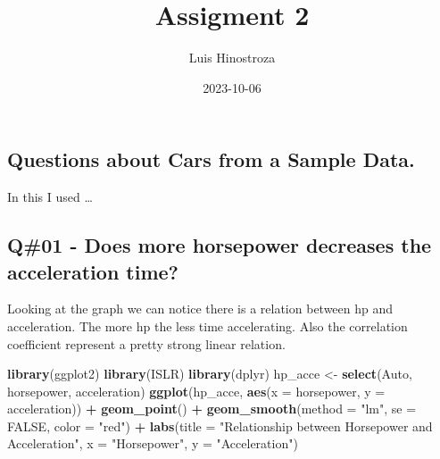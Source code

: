 \documentclass[
]{article}
\title{Assigment 2}
\author{Luis Hinostroza}
\date{2023-10-06}
\newenvironment{Shaded}{\begin{snugshade}}{\end{snugshade}}
\newcommand{\AttributeTok}[1]{\textcolor[rgb]{0.13,0.29,0.53}{#1}}
\newcommand{\ConstantTok}[1]{\textcolor[rgb]{0.56,0.35,0.01}{#1}}
\newcommand{\FunctionTok}[1]{\textcolor[rgb]{0.13,0.29,0.53}{\textbf{#1}}}
\newcommand{\NormalTok}[1]{#1}
\newcommand{\OtherTok}[1]{\textcolor[rgb]{0.56,0.35,0.01}{#1}}
\newcommand{\SpecialCharTok}[1]{\textcolor[rgb]{0.81,0.36,0.00}{\textbf{#1}}}
\newcommand{\StringTok}[1]{\textcolor[rgb]{0.31,0.60,0.02}{#1}}
\begin{document}
\maketitle

\hypertarget{questions-about-cars-from-a-sample-data.}{%
\subsection{Questions about Cars from a Sample
Data.}\label{questions-about-cars-from-a-sample-data.}}

In this I used \ldots{}

\newpage

\hypertarget{q01---does-more-horsepower-decreases-the-acceleration-time}{%
\subsection{Q\#01 - Does more horsepower decreases the acceleration
time?}\label{q01---does-more-horsepower-decreases-the-acceleration-time}}

Looking at the graph we can notice there is a relation between hp and
acceleration. The more hp the less time accelerating. Also the
correlation coefficient represent a pretty strong linear relation.

\begin{Shaded}
\begin{Highlighting}[]
\FunctionTok{library}\NormalTok{(ggplot2)}
\FunctionTok{library}\NormalTok{(ISLR)}
\FunctionTok{library}\NormalTok{(dplyr)}
\NormalTok{hp\_acce }\OtherTok{\textless{}{-}} \FunctionTok{select}\NormalTok{(Auto, horsepower, acceleration)}
\FunctionTok{ggplot}\NormalTok{(hp\_acce, }\FunctionTok{aes}\NormalTok{(}\AttributeTok{x =}\NormalTok{ horsepower, }\AttributeTok{y =}\NormalTok{ acceleration)) }\SpecialCharTok{+}
  \FunctionTok{geom\_point}\NormalTok{() }\SpecialCharTok{+}
  \FunctionTok{geom\_smooth}\NormalTok{(}\AttributeTok{method =} \StringTok{"lm"}\NormalTok{, }\AttributeTok{se =} \ConstantTok{FALSE}\NormalTok{, }\AttributeTok{color =} \StringTok{"red"}\NormalTok{) }\SpecialCharTok{+}
  \FunctionTok{labs}\NormalTok{(}\AttributeTok{title =} \StringTok{"Relationship between Horsepower and Acceleration"}\NormalTok{,}
       \AttributeTok{x =} \StringTok{"Horsepower"}\NormalTok{,}
       \AttributeTok{y =} \StringTok{"Acceleration"}\NormalTok{)}
\end{Highlighting}
\end{Shaded}
\end{document}
